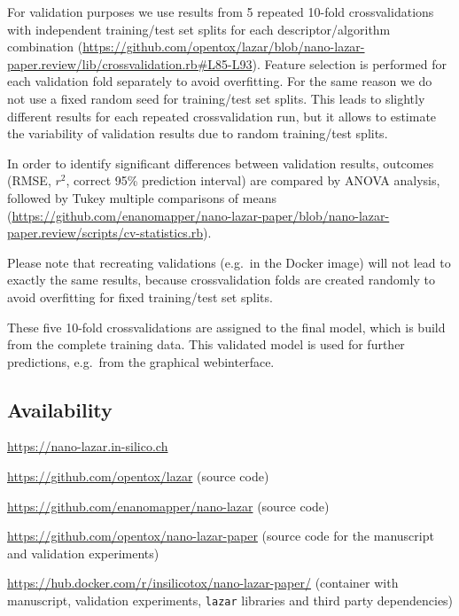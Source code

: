 \documentclass[utf8]{frontiersHLTH} %
\makeatletter
\providecommand{\tightlist}{%
  \setlength{\itemsep}{0pt}\setlength{\parskip}{0pt}}
\newenvironment{description}
	{\list{}{\labelwidth\z@ \itemindent-\leftmargin
		\let\makelabel\descriptionlabel}}
	{\endlist}
\newcommand*\descriptionlabel[1]{\hspace\labelsep
	\normalfont\bfseries #1}
\makeatother
\begin{document}
For validation purposes we use results from 5 repeated 10-fold
crossvalidations with independent training/test set splits for each
descriptor/algorithm combination
(\url{https://github.com/opentox/lazar/blob/nano-lazar-paper.review/lib/crossvalidation.rb\#L85-L93}).
Feature selection is performed for each validation fold separately to
avoid overfitting. For the same reason we do not use a fixed random seed
for training/test set splits. This leads to slightly different results
for each repeated crossvalidation run, but it allows to estimate the
variability of validation results due to random training/test splits.

In order to identify significant differences between validation results,
outcomes (RMSE, \(r^2\), correct 95\% prediction interval) are compared
by ANOVA analysis, followed by Tukey multiple comparisons of means
(\url{https://github.com/enanomapper/nano-lazar-paper/blob/nano-lazar-paper.review/scripts/cv-statistics.rb}).

Please note that recreating validations (e.g.~in the Docker image) will
not lead to exactly the same results, because crossvalidation folds are
created randomly to avoid overfitting for fixed training/test set
splits.

These five 10-fold crossvalidations are assigned to the final model,
which is build from the complete training data. This validated model is
used for further predictions, e.g.~from the graphical webinterface.

\subsection{Availability}\label{availability}

\begin{description}
\tightlist
\item[Public webinterface]
\url{https://nano-lazar.in-silico.ch}
\item[\texttt{lazar} framework]
\url{https://github.com/opentox/lazar} (source code)
\item[\texttt{nano-lazar} GUI]
\url{https://github.com/enanomapper/nano-lazar} (source code)
\item[Manuscript]
\url{https://github.com/opentox/nano-lazar-paper} (source code for the
manuscript and validation experiments)
\item[Docker image]
\url{https://hub.docker.com/r/insilicotox/nano-lazar-paper/} (container
with manuscript, validation experiments, \texttt{lazar} libraries and
third party dependencies)
\end{description}
\end{document}
